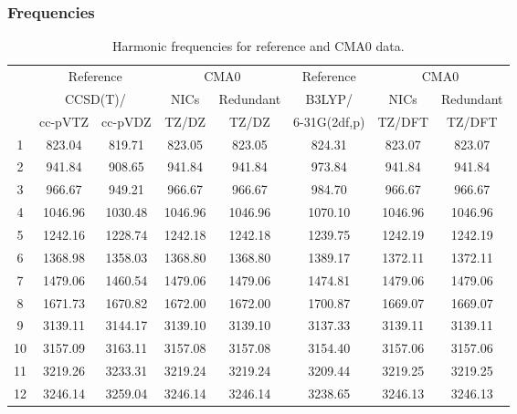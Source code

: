 \documentclass[10pt,oneside]{article}
\begin{document}
\begin{table}[h!]
\subsubsection*{Frequencies}
\centering
\caption{Harmonic frequencies for reference and CMA0 data.}
\begin{tabular}{cccccccc}
\toprule
{} & \multicolumn{2}{c}{Reference} & \multicolumn{2}{c}{CMA0} &    Reference & \multicolumn{2}{c}{CMA0} \\
{} & \multicolumn{2}{c}{CCSD(T)/} &    NICs &  Redundant &       B3LYP/ &    NICs & Redundant \\
{} &   cc-pVTZ & cc-pVDZ &   TZ/DZ &      TZ/DZ & 6-31G(2df,p) &  TZ/DFT &    TZ/DFT \\
\midrule
1  &    823.04 &  819.71 &  823.05 &     823.05 &       824.31 &  823.07 &    823.07 \\
2  &    941.84 &  908.65 &  941.84 &     941.84 &       973.84 &  941.84 &    941.84 \\
3  &    966.67 &  949.21 &  966.67 &     966.67 &       984.70 &  966.67 &    966.67 \\
4  &   1046.96 & 1030.48 & 1046.96 &    1046.96 &      1070.10 & 1046.96 &   1046.96 \\
5  &   1242.16 & 1228.74 & 1242.18 &    1242.18 &      1239.75 & 1242.19 &   1242.19 \\
6  &   1368.98 & 1358.03 & 1368.80 &    1368.80 &      1389.17 & 1372.11 &   1372.11 \\
7  &   1479.06 & 1460.54 & 1479.06 &    1479.06 &      1474.81 & 1479.06 &   1479.06 \\
8  &   1671.73 & 1670.82 & 1672.00 &    1672.00 &      1700.87 & 1669.07 &   1669.07 \\
9  &   3139.11 & 3144.17 & 3139.10 &    3139.10 &      3137.33 & 3139.11 &   3139.11 \\
10 &   3157.09 & 3163.11 & 3157.08 &    3157.08 &      3154.40 & 3157.06 &   3157.06 \\
11 &   3219.26 & 3233.31 & 3219.24 &    3219.24 &      3209.44 & 3219.25 &   3219.25 \\
12 &   3246.14 & 3259.04 & 3246.14 &    3246.14 &      3238.65 & 3246.13 &   3246.13 \\
\bottomrule
\end{tabular}
\end{table}
\end{document}
